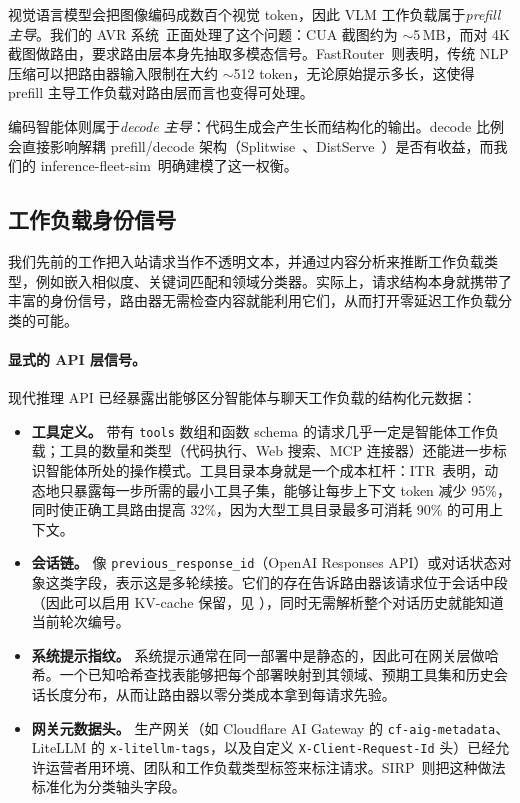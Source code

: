 视觉语言模型会把图像编码成数百个视觉 token，因此 VLM 工作负载属于\emph{prefill 主导}。我们的 AVR 系统~\cite{avr2026}正面处理了这个问题：CUA 截图约为 $\sim$5\,MB，而对 4K 截图做路由，要求路由层本身先抽取多模态信号。FastRouter~\cite{fastrouter2026}则表明，传统 NLP 压缩可以把路由器输入限制在大约 $\sim$512 token，无论原始提示多长，这使得 prefill 主导工作负载对路由层而言也变得可处理。

编码智能体则属于\emph{decode 主导}：代码生成会产生长而结构化的输出。decode 比例会直接影响解耦 prefill/decode 架构（Splitwise~\cite{patel2024splitwise}、DistServe~\cite{zhong2024distserve}）是否有收益，而我们的 inference-fleet-sim~\cite{fleetsim2026}明确建模了这一权衡。

\subsection{工作负载身份信号}
\label{sec:workload:identity}

我们先前的工作把入站请求当作不透明文本，并通过内容分析来推断工作负载类型，例如嵌入相似度、关键词匹配和领域分类器。实际上，请求结构本身就携带了丰富的身份信号，路由器无需检查内容就能利用它们，从而打开零延迟工作负载分类的可能。

\paragraph{显式的 API 层信号。}
现代推理 API 已经暴露出能够区分智能体与聊天工作负载的结构化元数据：
\begin{itemize}[nosep]
  \item \textbf{工具定义。} 带有 \texttt{tools} 数组和函数 schema 的请求几乎一定是智能体工作负载；工具的数量和类型（代码执行、Web 搜索、MCP 连接器）还能进一步标识智能体所处的操作模式。工具目录本身就是一个成本杠杆：ITR~\cite{itr2026}表明，动态地只暴露每一步所需的最小工具子集，能够让每步上下文 token 减少 95\%，同时使正确工具路由提高 32\%，因为大型工具目录最多可消耗 90\% 的可用上下文。
  \item \textbf{会话链。} 像 \texttt{previous\_response\_id}（OpenAI Responses API）或对话状态对象这类字段，表示这是多轮续接。它们的存在告诉路由器该请求位于会话中段（因此可以启用 KV-cache 保留，见 ），同时无需解析整个对话历史就能知道当前轮次编号。
  \item \textbf{系统提示指纹。} 系统提示通常在同一部署中是静态的，因此可在网关层做哈希。一个已知哈希查找表能够把每个部署映射到其领域、预期工具集和历史会话长度分布，从而让路由器以零分类成本拿到每请求先验。
  \item \textbf{网关元数据头。} 生产网关（如 Cloudflare AI Gateway 的 \texttt{cf-aig-metadata}、LiteLLM 的 \texttt{x-litellm-tags}，以及自定义 \texttt{X-Client-Request-Id} 头）已经允许运营者用环境、团队和工作负载类型标签来标注请求。SIRP~\cite{sirp2025}则把这种做法标准化为分类轴头字段。
\end{itemize}

